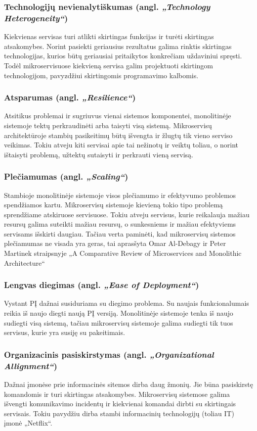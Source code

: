 \subsubsection{Technologijų nevienalytiškumas (angl. \textit{„Technology Heterogeneity“})}
Kiekvienas servisas turi atlikti skirtingas funkcijas ir turėti skirtingas atsakomybes. Norint pasiekti
geriausius rezultatus galima rinktis skirtingas technologijas, kurios būtų geriausiai pritaikytos konkrečiam uždaviniui spręsti.
Todėl mikroservisuose kiekvieną servisa galim projektuoti skirtingom technologijom, pavyzdžiui skirtingomis programavimo kalbomis.
\subsubsection{Atsparumas (angl. \textit{„Resilience“})}
Atsitikus problemai ir sugriuvus vienai sistemos komponentei, monolitinėje sistemoje tektų perkraudinėti arba taisyti visą sistemą.
Mikroservisų architektūroje stambių pasikeitimų būtų išvengta ir žlugtų tik vieno serviso veikimas. Tokiu atveju kiti servisai
apie tai nežinotų ir veiktų toliau, o norint ištaisyti problemą, užtektų sutaisyti ir perkrauti vieną servisą.
\subsubsection{Plečiamumas (angl. \textit{„Scaling“})}
Stambioje monolitinėje sistemoje visos plečiamumo ir efektyvumo problemos spendžiamos kartu. Mikroservisų sistemoje
kievieną tokio tipo problemą sprendžiame atskiruose servisuose. Tokiu atveju servisus, kurie reikalauja mažiau resursų
galima suteikti mažiau resursų, o sunkesniems ir mažiau efektyviems servisams išskirti daugiau.
Tačiau verta paminėti, kad mikroservisų sistemos plečiamumas ne visada yra geras, tai aprasšyta
Omar Al-Debagy ir Peter Martinek straipsnyje „A Comparative Review of Microservices and Monolithic Architecture“ \cite{Misc3}
\subsubsection{Lengvas diegimas (angl. \textit{„Ease of Deployment“})}
Vystant PĮ dažnai susiduriama su diegimo problema. Su naujais funkcionalumais reikia iš naujo diegti naują PĮ versiją.
Monolitinėje sistemoje tenka iš naujo sudiegti visą sistemą, tačiau mikroservisų sistemoje galima sudiegti tik tuos servisus, kurie yra susiję
su pakeitimais.
\subsubsection{Organizacinis pasiskirstymas (angl. \textit{„Organizational Allignment“})}
Dažnai įmonėse prie informacinės sitemos dirba daug žmonių. Jie būna pasiskirstę komandomis ir turi skirtingas atsakomybes.
Mikroservisų sistemose galima išvengti komunikavimo incidentų ir kiekvienai komandai dirbti su skirtingais servisais.
Tokiu pavydžiu dirba stambi informacinių technologijų (toliau IT) įmonė „Netflix“.
